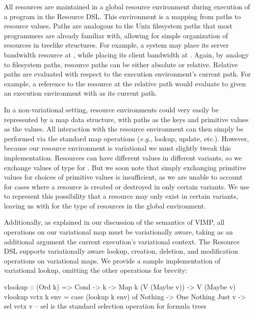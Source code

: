 \documentclass[12pt,oneside]{book}
\begin{document}
All resources are maintained in a global resource environment during execution of a program
in the Resource DSL. This environment is a mapping from paths to resource values. Paths are
analogous to the Unix filesystem paths that most programmers are already familiar with, allowing for
simple organization of resources in treelike structures. For example, a system may place its server
bandwidth resource at , while placing its client bandwidth at .
Again, by analogy to filesystem paths, resource paths can be either absolute or relative. Relative paths are
evaluated with respect to the execution environment's current path. For example, a reference to the resource
at the relative path  would evaluate to 
given an execution environment with  as its current path.

In a non-variational setting, resource environments could very easily be represented by a map data structure,
with paths as the keys and primitive values as the values. All interaction with the resource environment can then
simply be performed via the standard map operations (\emph{e.g.}, lookup, update, etc.). However, because our resource environment
is variational we must slightly tweak this implementation. Resources can have different values in different
variants, so we exchange values of type  for . But we soon note that simply exchanging primitive values
for choices of primitive values is insufficient, as we are unable to
account for cases where a resource is created or destroyed in only certain variants. We use  to represent this possibility
that a resource may only exist in certain variants, leaving us with  for the type of resources in the global environment.

Additionally, as explained in our discussion of the semantics of VIMP, all operations on our variational map must be variationally aware,
taking as an additional argument the current execution's variational context. The Resource DSL supports variationally aware lookup,
creation, deletion, and modification operations on variational maps. We provide a sample implementation of variational lookup, omitting
the other operations for brevity:

\begin{program}
vlookup :: (Ord k) => Cond -> k -> Map k (V (Maybe v)) -> V (Maybe v)
vlookup vctx k env = case (lookup k env) of
    Nothing -> One Nothing
    Just v -> sel vctx v  -- sel is the standard selection operation for formula trees
\end{program}
\end{document}

